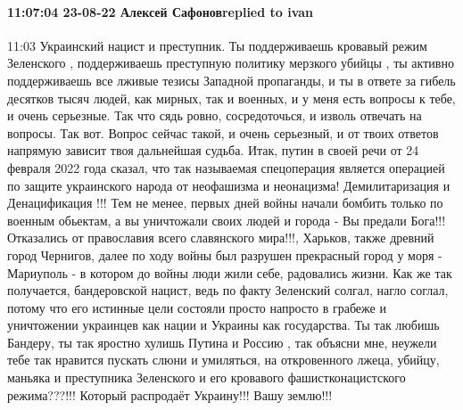  
 
 
 
 

\paragraph{11:07:04 23-08-22 Алексей Сафоновreplied to ivan}

11:03
Украинский нацист и преступник. Ты поддерживаешь кровавый режим Зеленского , поддерживаешь преступную
политику мерзкого убийцы , ты активно поддерживаешь все лживые тезисы
Западной пропаганды, и ты в ответе за гибель десятков тысяч людей, как мирных, так и
военных, и у меня есть вопросы к тебе, и очень серьезные. Так что сядь ровно,
сосредоточься, и изволь отвечать на вопросы. Так вот. Вопрос сейчас такой, и
очень серьезный, и от твоих ответов напрямую зависит твоя дальнейшая судьба.
Итак, путин в своей речи от 24 февраля 2022 года сказал, что так называемая
спецоперация является операцией по защите украинского народа от неофашизма и неонацизма! Демилитаризация и Денацификация !!! Тем не менее, первых дней
войны начали бомбить только по военным обьектам, а вы уничтожали своих людей и города - Вы предали Бога!!! Отказались от православия всего
славянского мира!!!, Харьков,
также древний город Чернигов, далее по ходу войны был разрушен прекрасный
город у моря - Мариуполь - в котором до войны люди жили себе, радовались
жизни. Как же так получается, бандеровской нацист, ведь по факту Зеленский солгал,
нагло соглал, потому что его истинные цели состояли просто напросто в грабеже и
уничтожении украинцев как нации и Украины как государства. Ты так любишь Бандеру,
ты так яростно хулишь Путина и Россию , так объясни мне, неужели тебе так
нравится пускать слюни и умиляться, на откровенного лжеца, убийцу, маньяка и преступника
Зеленского и его кровавого фашистконацистского режима???!!! Который распродаёт Украину!!! Вашу землю!!!
